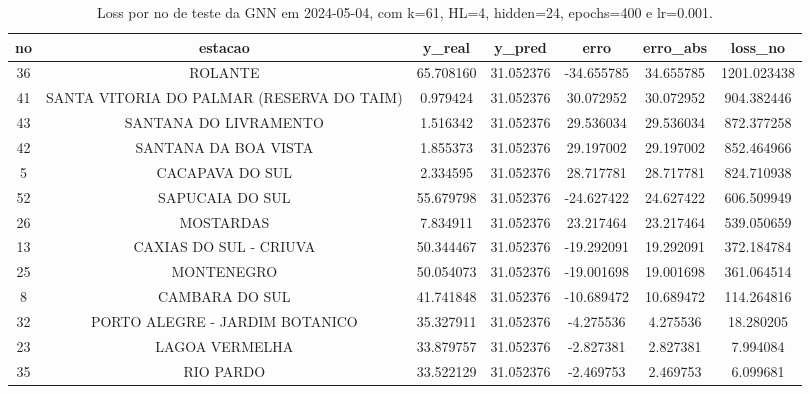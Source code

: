 \begin{table}[h]
\centering
\caption{Loss por no de teste da GNN em 2024-05-04, com k=61, HL=4, hidden=24, epochs=400 e lr=0.001.}
\label{tab:gnn_loss_k61_hl4_h24_e400_d20240504}
\begin{tabular}{ccccccc}
\toprule
no & estacao & y\_real & y\_pred & erro & erro\_abs & loss\_no \\
\midrule
36 & ROLANTE & 65.708160 & 31.052376 & -34.655785 & 34.655785 & 1201.023438 \\
41 & SANTA VITORIA DO PALMAR (RESERVA DO TAIM) & 0.979424 & 31.052376 & 30.072952 & 30.072952 & 904.382446 \\
43 & SANTANA DO LIVRAMENTO & 1.516342 & 31.052376 & 29.536034 & 29.536034 & 872.377258 \\
42 & SANTANA DA BOA VISTA & 1.855373 & 31.052376 & 29.197002 & 29.197002 & 852.464966 \\
5 & CACAPAVA DO SUL & 2.334595 & 31.052376 & 28.717781 & 28.717781 & 824.710938 \\
52 & SAPUCAIA DO SUL & 55.679798 & 31.052376 & -24.627422 & 24.627422 & 606.509949 \\
26 & MOSTARDAS & 7.834911 & 31.052376 & 23.217464 & 23.217464 & 539.050659 \\
13 & CAXIAS DO SUL - CRIUVA & 50.344467 & 31.052376 & -19.292091 & 19.292091 & 372.184784 \\
25 & MONTENEGRO & 50.054073 & 31.052376 & -19.001698 & 19.001698 & 361.064514 \\
8 & CAMBARA DO SUL & 41.741848 & 31.052376 & -10.689472 & 10.689472 & 114.264816 \\
32 & PORTO ALEGRE - JARDIM BOTANICO & 35.327911 & 31.052376 & -4.275536 & 4.275536 & 18.280205 \\
23 & LAGOA VERMELHA & 33.879757 & 31.052376 & -2.827381 & 2.827381 & 7.994084 \\
35 & RIO PARDO & 33.522129 & 31.052376 & -2.469753 & 2.469753 & 6.099681 \\
\bottomrule
\end{tabular}
\end{table}
